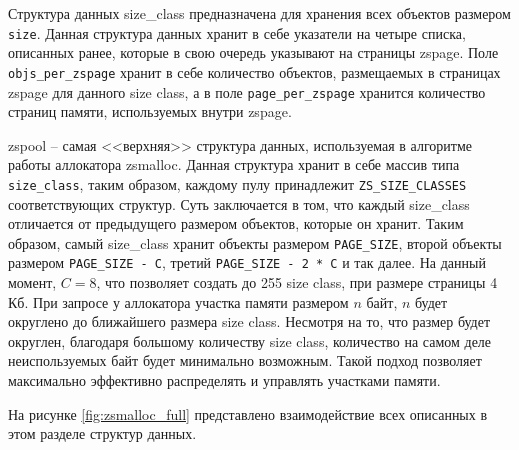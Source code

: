 
Структура данных size\_class предназначена для хранения всех объектов размером \texttt{size}. Данная структура данных хранит в себе указатели на  четыре списка, описанных ранее, которые в свою очередь указывают на страницы zspage. Поле \texttt{objs\_per\_zspage} хранит в себе количество объектов, размещаемых в страницах zspage для данного size class, а в поле \texttt{page\_per\_zspage} хранится количество страниц памяти, используемых внутри zspage.


zspool -- самая <<верхняя>> структура данных, используемая в алгоритме работы аллокатора zsmalloc. Данная структура хранит в себе массив типа \\ \texttt{size\_class}, таким образом, каждому пулу принадлежит \texttt{ZS\_SIZE\_CLASSES} соответствующих структур. Суть заключается в том, что каждый size\_class отличается от предыдущего размером объектов, которые он хранит. Таким образом, самый size\_class хранит объекты размером \texttt{PAGE\_SIZE}, второй объекты размером \texttt{PAGE\_SIZE - C}, третий \texttt{PAGE\_SIZE - 2 * C} и так далее. На данный момент, $C = 8$, что позволяет создать до 255 size class, при размере страницы 4 Кб. При запросе у аллокатора участка памяти размером $n$ байт, $n$ будет округлено до ближайшего размера size class. Несмотря на то, что размер будет округлен, благодаря большому количеству size class, количество на самом деле неиспользуемых байт будет минимально возможным.  Такой подход позволяет максимально эффективно распределять и управлять участками памяти.

На рисунке \ref{fig:zsmalloc_full} представлено взаимодействие всех описанных в этом разделе структур данных.

